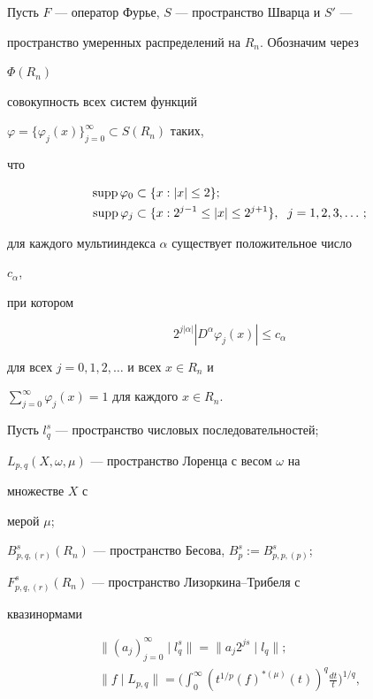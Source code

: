  


Пусть $F$ --- оператор Фурье, $S$ --- пространство Шварца и $S'$ --- 


пространство умеренных распределений на $R_n$. Обозначим через 


$\Phi(R_n)$ 


совокупность всех систем функций 


$\varphi=\{\varphi_j(x)\}^\infty_{j=0}\subset S(R_n)$ таких, 


что 


\begin{align*} 


\supp\varphi_0&\subset \{x:|x|\le 2\};\\ 


\supp\varphi_j&\subset\{x:2^{j-1}\le|x|\le 2^{j+1}\}, 


\ \; j=1,2,3,\dotsc; 


\end{align*} 


для каждого мультииндекса $\alpha$ существует положительное число 


$c_\alpha$, 


при котором 


$$ 


2^{j|\alpha|}|D^\alpha\varphi_j(x)|\le c_\alpha 


$$ 


для всех $j=0,1,2,\dotsc$ и всех $x\in R_n$ и 


$\sum\limits^\infty_{j=0}\varphi_j(x)=1$ для каждого $x\in R_n$. 


 


Пусть $l^s_q$ --- пространство числовых последовательностей; 


$L_{p,q}(X,\omega,\mu)$ --- пространство Лоренца с весом $\omega$ на 


множестве $X$ с 


мерой $\mu$; 


$B^s_{p,q,(r)}(R_n)$ --- пространство Бесова, $B^s_p:=B^s_{p,p,(p)}$; 


$F^s_{p,q,(r)}(R_n)$ --- пространство Лизоркина--Трибеля с 


квазинормами 


\begin{gather*} 


\|(a_j)^\infty_{j=0}\mid l^s_q\|=\|a_j2^{js}\mid l_q\|;\\ 


\|f\mid L_{p,q}\|=\bigg(\int^\infty_0(t^{1/p}(f)^{*(\mu)} 


(t))^q\frac{dt}{t}\bigg)^{1/q}, 


\end{gather*} 


